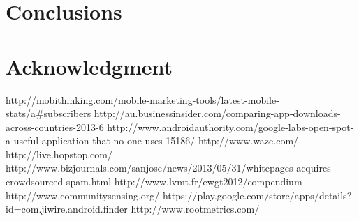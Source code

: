 \documentclass[conference,letterpaper]{IEEEtran}
\begin{document}
\section{Conclusions}
\label{sec:conclusion_and_future_work}
\section{Acknowledgment}
\label{sec:acknowledgment}
http://mobithinking.com/mobile-marketing-tools/latest-mobile-stats/a\#subscribers
http://au.businessinsider.com/comparing-app-downloads-across-countries-2013-6
http://www.androidauthority.com/google-labs-open-spot-a-useful-application-that-no-one-uses-15186/
http://www.waze.com/
http://live.hopstop.com/
http://www.bizjournals.com/sanjose/news/2013/05/31/whitepages-acquires-crowdsourced-spam.html
http://www.lvmt.fr/ewgt2012/compendium
http://www.communitysensing.org/
https://play.google.com/store/apps/details?id=com.jiwire.android.finder
http://www.rootmetrics.com/
\end{document}
